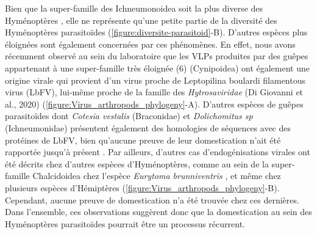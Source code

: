 Bien que la super-famille des Ichneumonoidea soit la plus diverse des Hyménoptères \citep{klopfstein_darwin_2019,shimizu_integrative_2020}, elle ne représente qu'une petite partie de la diversité des Hyménoptères parasitoïdes \citep{forbes_1_2018} (\figurename{\ref{figure:diversite-parasitoid}}-B). D'autres espèces plus éloignées sont également concernées par ces phénomènes. En effet, nous avons récemment observé au sein du laboratoire que les VLPs produites par des guêpes appartenant à une super-famille très éloignée (6) (Cynipoidea) ont également une origine virale qui provient d'un virus proche de Leptopilina boulardi filamentous virus (LbFV), lui-même proche de la famille des \textit{Hytrosaviridae} (Di Giovanni et al., 2020) (\figurename{\ref{figure:Virus_arthropods_phylogeny}}-A). D'autres espèces de guêpes parasitoïdes dont \textit{Cotesia vestalis} (Braconidae) et \textit{Dolichomitus sp} (Ichneumonidae) présentent également des homologies de séquences avec des protéines de LbFV, bien qu'aucune preuve de leur domestication n'ait été rapportée jusqu'à présent \citep{burke_presence_2021}. Par ailleurs, d'autres cas d'endogénisations virales ont été décrits chez d'autres espèces d'Hyménoptères, comme au sein de la super-famille Chalcidoidea chez l'espèce \textit{Eurytoma brunniventris} \citep{zhang_chalcid_2020}, et même chez plusieurs espèces d'Hémiptères (\figurename{\ref{figure:Virus_arthropods_phylogeny}}-B). Cependant, aucune preuve de domestication n'a été trouvée chez ces dernières. Dans l'ensemble, ces observations suggèrent donc que la domestication au sein des Hyménoptères parasitoïdes pourrait être un processus récurrent. \newpage

